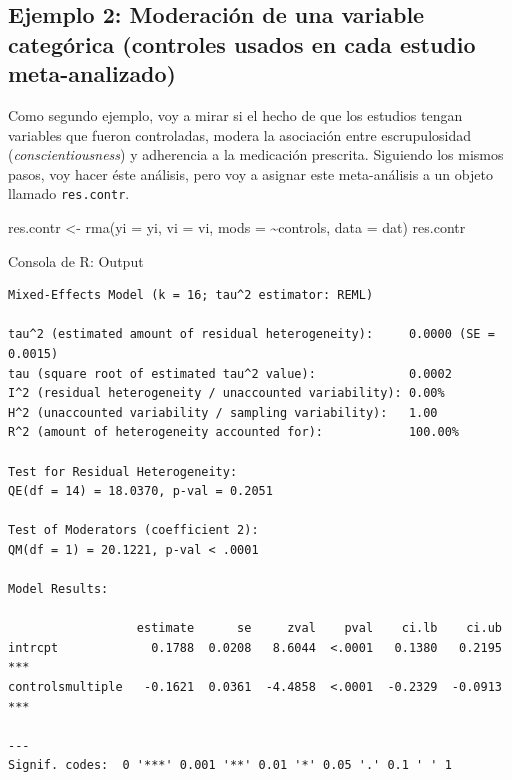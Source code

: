 \documentclass[
  bookmarksnumbered]{article}
\newenvironment{Shaded}{\begin{snugshade}}{\end{snugshade}}
\newcommand{\AttributeTok}[1]{\textcolor[rgb]{0.00,0.34,0.68}{#1}}
\newcommand{\FunctionTok}[1]{\textcolor[rgb]{0.39,0.29,0.61}{#1}}
\newcommand{\NormalTok}[1]{\textcolor[rgb]{0.12,0.11,0.11}{#1}}
\newcommand{\OtherTok}[1]{\textcolor[rgb]{0.00,0.43,0.16}{#1}}
\newcommand{\SpecialCharTok}[1]{\textcolor[rgb]{0.24,0.68,0.91}{#1}}
\begin{document}
\hypertarget{ejemplo-2-moderaciuxf3n-de-una-variable-categuxf3rica-controles-usados-en-cada-estudio-meta-analizado}{%
\subsection{Ejemplo 2: Moderación de una variable categórica (controles usados en cada estudio meta-analizado)}\label{ejemplo-2-moderaciuxf3n-de-una-variable-categuxf3rica-controles-usados-en-cada-estudio-meta-analizado}}

Como segundo ejemplo, voy a mirar si el hecho de que los estudios tengan variables que fueron controladas, modera la asociación entre escrupulosidad (\emph{conscientiousness}) y adherencia a la medicación prescrita. Siguiendo los mismos pasos, voy hacer éste análisis, pero voy a asignar este meta-análisis a un objeto llamado \texttt{res.contr}.

\begin{Shaded}
\begin{Highlighting}[]
\NormalTok{res.contr }\OtherTok{\textless{}{-}} \FunctionTok{rma}\NormalTok{(}\AttributeTok{yi =}\NormalTok{ yi, }\AttributeTok{vi =}\NormalTok{ vi, }\AttributeTok{mods =} \SpecialCharTok{\textasciitilde{}}\NormalTok{controls, }\AttributeTok{data =}\NormalTok{ dat)}
\NormalTok{res.contr}
\end{Highlighting}
\end{Shaded}

\begin{ROut}{Consola de R: Output~\thetcbcounter}
                \begin{footnotesize}
                \begin{verbatim} 
Mixed-Effects Model (k = 16; tau^2 estimator: REML)

tau^2 (estimated amount of residual heterogeneity):     0.0000 (SE = 0.0015)
tau (square root of estimated tau^2 value):             0.0002
I^2 (residual heterogeneity / unaccounted variability): 0.00%
H^2 (unaccounted variability / sampling variability):   1.00
R^2 (amount of heterogeneity accounted for):            100.00%

Test for Residual Heterogeneity:
QE(df = 14) = 18.0370, p-val = 0.2051

Test of Moderators (coefficient 2):
QM(df = 1) = 20.1221, p-val < .0001

Model Results:

                  estimate      se     zval    pval    ci.lb    ci.ub      
intrcpt             0.1788  0.0208   8.6044  <.0001   0.1380   0.2195  *** 
controlsmultiple   -0.1621  0.0361  -4.4858  <.0001  -0.2329  -0.0913  *** 

---
Signif. codes:  0 '***' 0.001 '**' 0.01 '*' 0.05 '.' 0.1 ' ' 1
 \end{verbatim}
                \end{footnotesize}
                \end{ROut}
\end{document}
